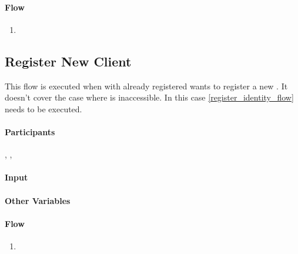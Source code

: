 \documentclass[a4paper,10pt]{article}
\begin{document}
\paragraph{Flow}

\begin{enumerate}
 \item
\end{enumerate}

\subsection{Register New Client}
\label{register_new_client_flow}
This flow is executed when  with already registered  wants to register a new . It doesn't cover the case where  is inaccessible. 
In this case \ref{register_identity_flow} needs to be executed.

\paragraph{Participants} , , 

\paragraph{Input}
\SpecialItem
\begin{description}
 \item[]
\end{description}

\paragraph{Other Variables}
\SpecialItem
\begin{description}
 \item[]
\end{description}

\paragraph{Flow}

\begin{enumerate}
 \item
\end{enumerate}



\end{document}

